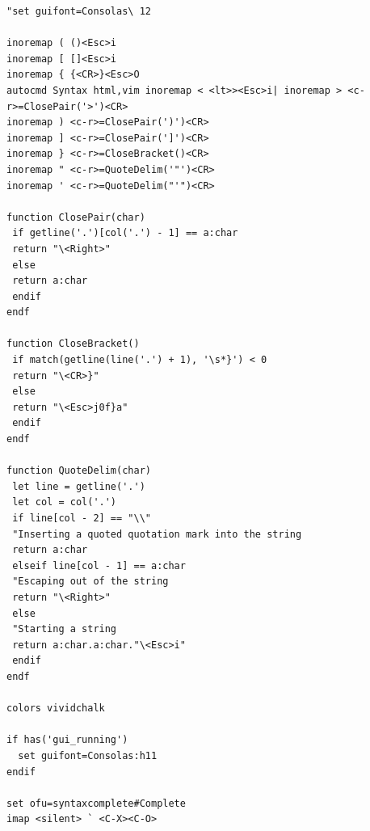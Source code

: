 \documentclass[a4paper]{article}
\begin{document}
\begin{CJK*}{UTF8}{gbsn}
\begin{multicols}{3}
\begin{flushleft}
\begin{lstlisting}
"set guifont=Consolas\ 12

inoremap ( ()<Esc>i
inoremap [ []<Esc>i
inoremap { {<CR>}<Esc>O
autocmd Syntax html,vim inoremap < <lt>><Esc>i| inoremap > <c-r>=ClosePair('>')<CR>
inoremap ) <c-r>=ClosePair(')')<CR>
inoremap ] <c-r>=ClosePair(']')<CR>
inoremap } <c-r>=CloseBracket()<CR>
inoremap " <c-r>=QuoteDelim('"')<CR>
inoremap ' <c-r>=QuoteDelim("'")<CR>

function ClosePair(char)
 if getline('.')[col('.') - 1] == a:char
 return "\<Right>"
 else
 return a:char
 endif
endf

function CloseBracket()
 if match(getline(line('.') + 1), '\s*}') < 0
 return "\<CR>}"
 else
 return "\<Esc>j0f}a"
 endif
endf

function QuoteDelim(char)
 let line = getline('.')
 let col = col('.')
 if line[col - 2] == "\\"
 "Inserting a quoted quotation mark into the string
 return a:char
 elseif line[col - 1] == a:char
 "Escaping out of the string
 return "\<Right>"
 else
 "Starting a string
 return a:char.a:char."\<Esc>i"
 endif
endf

colors vividchalk

if has('gui_running')
  set guifont=Consolas:h11
endif

set ofu=syntaxcomplete#Complete
imap <silent> ` <C-X><C-O>
\end{lstlisting}

\end{flushleft}
\clearpage
\end{multicols}

 \newpage

\end{CJK*}
\end{document}
